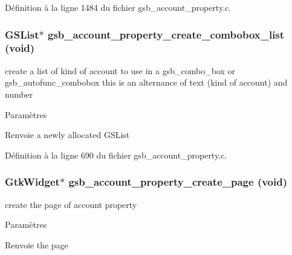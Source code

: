Définition à la ligne 1484 du fichier gsb\_\-account\_\-property.c.

\subsubsection[{gsb\_\-account\_\-property\_\-create\_\-combobox\_\-list}]{\setlength{\rightskip}{0pt plus 5cm}GSList$\ast$ gsb\_\-account\_\-property\_\-create\_\-combobox\_\-list (void)}\label{gsb__account__property_8h_ade6600516c1245dbeb1b249db4692a57}
create a list of kind of account to use in a gsb\_\-combo\_\-box or gsb\_\-autofunc\_\-combobox this is an alternance of text (kind of account) and number


\begin{DoxyParams}{Paramètres}
\item[{\em }]\end{DoxyParams}
\begin{DoxyReturn}{Renvoie}
a newly allocated GSList 
\end{DoxyReturn}


Définition à la ligne 690 du fichier gsb\_\-account\_\-property.c.

\subsubsection[{gsb\_\-account\_\-property\_\-create\_\-page}]{\setlength{\rightskip}{0pt plus 5cm}GtkWidget$\ast$ gsb\_\-account\_\-property\_\-create\_\-page (void)}\label{gsb__account__property_8h_a5266ddf452ec44e874324c9edc910f4e}
create the page of account property


\begin{DoxyParams}{Paramètres}
\item[{\em }]\end{DoxyParams}
\begin{DoxyReturn}{Renvoie}
the page 
\end{DoxyReturn}


